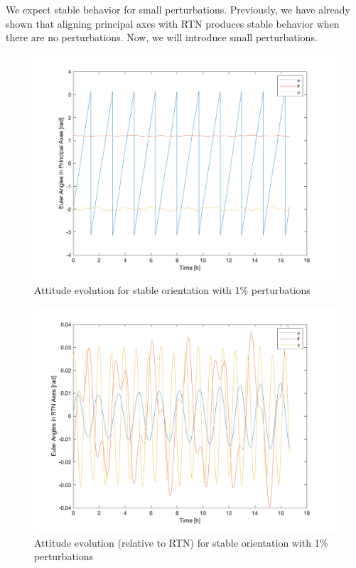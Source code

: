 We expect stable behavior for small perturbations. Previously, we have already shown that aligning principal axes with RTN produces stable behavior when there are no perturbations. Now, we will introduce small perturbations.

\begin{figure}[H]
\centering
\includegraphics[scale=0.6]{Images/ps5_problem1c_angle.png}
\caption{Attitude evolution for stable orientation with 1\% perturbations}
\label{fig:ps5_problem1c_angle}
\end{figure}

\begin{figure}[H]
\centering
\includegraphics[scale=0.6]{Images/ps5_problem1c_angle_rtn.png}
\caption{Attitude evolution (relative to RTN) for stable orientation with 1\% perturbations}
\label{fig:ps5_problem1c_angle_rtn}
\end{figure}

